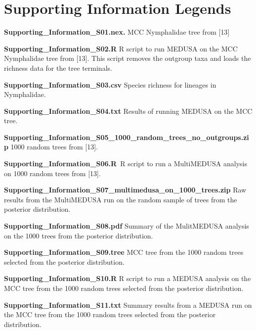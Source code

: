 \documentclass[10pt]{article}
\begin{document}
\section*{Supporting Information Legends}
\begin{description}
 \item {\bf Supporting\_Information\_S01.nex.} MCC Nymphalidae tree from
{[}13{]}
 
 \item {\bf Supporting\_Information\_S02.R} R script to run MEDUSA on the
MCC Nymphalidae tree from {[}13{]}. This script removes the outgroup
taxa and loads the richness data for the tree terminals.

 \item {\bf Supporting\_Information\_S03.csv} Species richness for lineages
in Nymphalidae.

 \item {\bf Supporting\_Information\_S04.txt} Results of running MEDUSA on
the MCC tree.

 \item {\bf Supporting\_Information\_S05\_1000\_random\_trees\_no\_outgroups.zip} 1000 random trees from {[}13{]}.
 
 \item {\bf Supporting\_Information\_S06.R} R script to run a MultiMEDUSA
analysis on 1000 random trees from {[}13{]}.

 \item {\bf Supporting\_Information\_S07\_multimedusa\_on\_1000\_trees.zip} Raw results from the MultiMEDUSA run on the random sample of trees from
the posterior distribution.

 \item {\bf Supporting\_Information\_S08.pdf} Summary of the MulitMEDUSA
analysis on the 1000 trees from the posterior distribution.

 \item {\bf Supporting\_Information\_S09.tree} MCC tree from the 1000
random trees selected from the posterior distribution.

 \item {\bf Supporting\_Information\_S10.R} R script to run a MEDUSA
analysis on the MCC tree from the 1000 random trees selected from the
posterior distribution.

 \item {\bf Supporting\_Information\_S11.txt} Summary results from a MEDUSA
run on the MCC tree from the 1000 random trees selected from the
posterior distribution.


\end{description}
\end{document}
